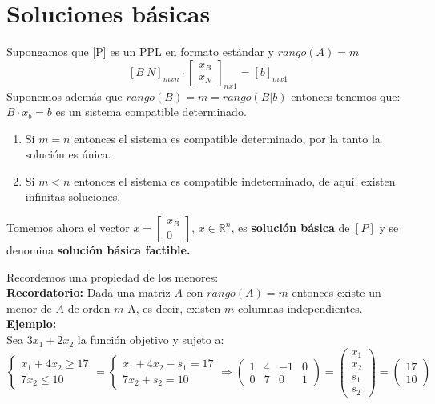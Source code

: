 \documentclass[11pt,fleqn]{book} %
\begin{document}
\section{Soluciones básicas}
\begin{definition}
  Supongamos que [P] es un PPL en formato estándar y $rango(A)=m$
  $$ [B ~ N] _{mxn} \cdot \left[\begin{array}{c}
	  x_B \\
	  x_N
	\end{array}\right]_{nx1}=[b]_{mx1}
  $$
  Suponemos además que $rango(B)=m=rango(B | b)$ entonces tenemos que:
  $ B \cdot x_b=b$ es un sistema compatible determinado.
  
  \begin{enumerate}
  \item Si $m=n$ entonces el sistema es compatible determinado, por la tanto la solución es única.
  \item Si $m<n$ entonces el sistema es compatible indeterminado, de aquí, existen infinitas soluciones.
  \end{enumerate}
  Tomemos ahora el vector $x=\left[\begin{array}{c}
	  x_B \\
	  0
	\end{array}\right]$, $x \in \mathbb{R}^n$, es \textbf{solución básica} de $[P]$ y se denomina \textbf{solución básica factible.}
\end{definition}
Recordemos una propiedad de los menores: \\
\textbf{Recordatorio: } Dada una matriz $A$ con $rango(A)=m$ entonces existe un menor de $A$ de orden $m$ A, es decir, existen $m$ columnas independientes. \\
\textbf{Ejemplo: } \\
Sea $3x_1+2x_2$ la función objetivo y sujeto a:
\begin{equation*}
  \left\lbrace
  \begin{array}{l}
    x_1+4x_2 \geq 17 \\
    7x_2 \leq 10
  \end{array}
  \right.
  =
  \left\lbrace
  \begin{array}{l}
    x_1+4x_2 -s_1= 17 \\
    7x_2 + s_2 = 10
  \end{array}
  \right.\Rightarrow
  \left(\begin{array}{cc|cc}
	1&4&-1&0\\
	0&7&0&1
  \end{array}\right)=
  \left(\begin{array}{c}
	x_1 \\
	x_2 \\
	s_1 \\
	s_2
  \end{array}\right)
  =
  \left(\begin{array}{c}
    17\\10
  \end{array}\right)
\end{equation*}
\end{document}

